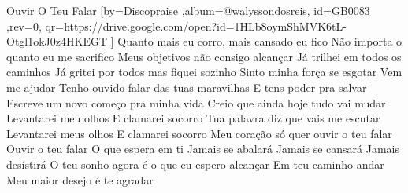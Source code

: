\beginsong
{Ouvir O Teu Falar %
}[by={Discopraise %
},album={@walyssondosreis},
id={GB0083 %
},rev={0}, %
qr={https://drive.google.com/open?id=1HLb8oymShMVK6tL-Otgl1okJ0z4HKEGT %
}]
\beginverse*
Quanto mais eu corro, mais cansado eu fico
Não importa o quanto eu me sacrifico
Meus objetivos não consigo alcançar
Já trilhei em todos os caminhos
Já gritei por todos mas fiquei sozinho
Sinto minha força se esgotar
Vem me ajudar
\endverse
\beginverse*
Tenho ouvido falar das tuas maravilhas
E tens poder pra salvar
Escreve um novo começo pra minha vida
Creio que ainda hoje tudo vai mudar
\endverse
\beginchorus
Levantarei meu olhos
E clamarei socorro
Tua palavra diz que vais me escutar
Levantarei meus olhos
E clamarei socorro
Meu coração só quer ouvir o teu falar
Ouvir o teu falar
\endchorus
\beginverse*
O que espera em ti
Jamais se abalará
Jamais se cansará
Jamais desistirá
O teu sonho agora é o que eu espero alcançar
Em teu caminho andar
Meu maior desejo é te agradar
\endverse
\vspace{4em} %
\begin{comment}
\lstset{basicstyle=\scriptsize\bf} %
\tab{Solo 1}
\begin{lstlisting}
E|-----------------------------------------------------|
B|-----------------------------------------------------|
G|-----------------------------------------------------|
D|-----------------------------------------------------|
A|-----------------------------------------------------|
E|-----------------------------------------------------|
\end{lstlisting}
\end{comment}
 
